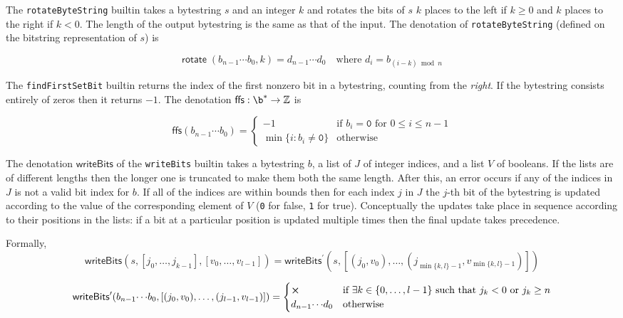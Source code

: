 \label{note:rotate}
The \texttt{rotateByteString} builtin takes a bytestring $s$ and an integer $k$
and rotates the bits of $s$ $k$ places to the left if $k \geq 0$ and $k$ places
to the right if $k < 0$.  The length of the output bytestring is the same as
that of the input.  The denotation of
\texttt{rotateByteString} (defined on the bitstring representation of $s$) is 

$$
\mathsf{rotate}\;(b_{n-1} \cdots b_0, k) = d_{n-1}\cdots d_0 \quad\text{where $d_i = b_{(i-k)\bmod n}$}
$$

\label{note:ffs}
The \texttt{findFirstSetBit} builtin returns the index of the first nonzero bit
in a bytestring, counting from the \textit{right}. If the bytestring consists
entirely of zeros then it returns $-1$.  The denotation
$\mathsf{ffs}: \b^* \rightarrow \Z$ is

$$
\mathsf{ffs}(b_{n-1}\cdots b_0) =
\begin{cases}
  -1 & \text{if $b_i = \mathtt{0}$ for $0 \leq i \leq n-1$}\\
  \min{\{i: b_i \ne \mathtt{0}\}} & \text{otherwise}
  \end{cases}
$$


\label{note:writebits}
The denotation $\mathsf{writeBits}$ of the \texttt{writeBits} builtin takes a
bytestring $b$, a list of $J$ of integer indices, and a list $V$ of booleans.
If the lists are of different lengths then the longer one is truncated to make
them both the same length.  After this, an error occurs if any of the indices in
$J$ is not a valid bit index for $b$.  If all of the indices are within bounds
then for each index $j$ in $J$ the $j$-th bit of the bytestring is updated
according to the value of the corresponding element of $V$ (\texttt{0}
for \textsf{false}, \texttt{1} for \textsf{true}).  Conceptually the updates
take place in sequence according to their positions in the lists: if a bit at a
particular position is updated multiple times then the final update takes
precedence.

\smallskip
\noindent Formally, 
$$
\mathsf{writeBits}(s, [j_0 , \ldots, j_{k-1}], [v_0, \ldots, v_{l-1}]) =
    \mathsf{writeBits}^{\prime} (s, [(j_0, v_0) , \ldots, (j_{\min\{k,l\}-1}, v_{\min\{k,l\}-1})])
$$

$$
\mathsf{writeBits}^{\prime}(b_{n-1}{\cdots}b_0, [(j_0,v_0), \ldots, (j_{l-1}, v_{l-1})]) = 
\begin{cases}
\errorX & \text{if $\exists k \in \{0, \ldots, l-1\}$ such that $j_k<0$ or $j_k \geq n$} \\
d_{n-1}{\cdots}d_0 & \text{otherwise}
\end{cases}
$$

